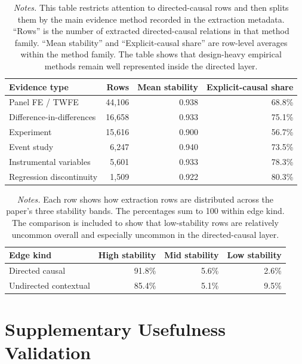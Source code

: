 \documentclass[11pt]{article}
\newcommand{\fignotes}[1]{\caption*{\textit{Notes.} #1}}
\begin{document}
\begin{table}[h]
  \caption{Directed-causal credibility audit by evidence type}
  \label{tab:credibility-by-evidence-type}
  \centering
  \begin{tabular}{lrrr}
    \toprule
    Evidence type & Rows & Mean stability & Explicit-causal share \\
    \midrule
    Panel FE / TWFE & 44{,}106 & 0.938 & 68.8\% \\
    Difference-in-differences & 16{,}658 & 0.933 & 75.1\% \\
    Experiment & 15{,}616 & 0.900 & 56.7\% \\
    Event study & 6{,}247 & 0.940 & 73.5\% \\
    Instrumental variables & 5{,}601 & 0.933 & 78.3\% \\
    Regression discontinuity & 1{,}509 & 0.922 & 80.3\% \\
    \bottomrule
  \end{tabular}
  \fignotes{This table restricts attention to directed-causal rows and then splits them by the main evidence method recorded in the extraction metadata. ``Rows'' is the number of extracted directed-causal relations in that method family. ``Mean stability'' and ``Explicit-causal share'' are row-level averages within the method family. The table shows that design-heavy empirical methods remain well represented inside the directed layer.}
\end{table}

\begin{table}[h]
  \caption{Stability bands by edge kind}
  \label{tab:credibility-stability-band}
  \centering
  \begin{tabular}{lrrr}
    \toprule
    Edge kind & High stability & Mid stability & Low stability \\
    \midrule
    Directed causal & 91.8\% & 5.6\% & 2.6\% \\
    Undirected contextual & 85.4\% & 5.1\% & 9.5\% \\
    \bottomrule
  \end{tabular}
  \fignotes{Each row shows how extraction rows are distributed across the paper's three stability bands. The percentages sum to 100 within edge kind. The comparison is included to show that low-stability rows are relatively uncommon overall and especially uncommon in the directed-causal layer.}
\end{table}

\section{Supplementary Usefulness Validation}
\label{app:current-usefulness}
\end{document}
